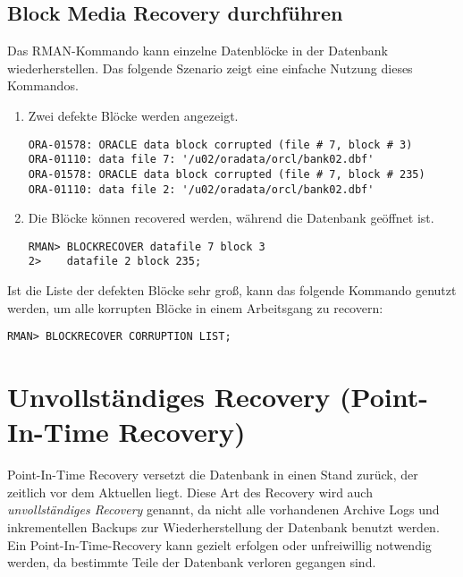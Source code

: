       \subsection{Block Media Recovery durchführen}
        Das RMAN-Kommando  kann einzelne Datenblöcke in der Datenbank wiederherstellen. Das folgende Szenario zeigt eine einfache Nutzung dieses Kommandos.
        \begin{enumerate}
          \item Zwei defekte Blöcke werden angezeigt.
          \begin{lstlisting}[caption={Der Fehler ORA-01578},label=admin1494,language=terminal]
ORA-01578: ORACLE data block corrupted (file # 7, block # 3)
ORA-01110: data file 7: '/u02/oradata/orcl/bank02.dbf'
ORA-01578: ORACLE data block corrupted (file # 7, block # 235)
ORA-01110: data file 2: '/u02/oradata/orcl/bank02.dbf'
          \end{lstlisting}
          \item Die Blöcke können recovered werden, während die Datenbank geöffnet ist.
          \begin{lstlisting}[caption={Das Kommando BLOCKRECOVER},label=admin1495,language=rman]
RMAN> BLOCKRECOVER datafile 7 block 3
2>    datafile 2 block 235;
          \end{lstlisting}
        \end{enumerate}
        Ist die Liste der defekten Blöcke sehr groß, kann das folgende Kommando genutzt werden, um alle korrupten Blöcke in einem Arbeitsgang zu recovern:
          \begin{lstlisting}[caption={Das Kommando BLOCKRECOVER},label=admin1496,language=rman]
RMAN> BLOCKRECOVER CORRUPTION LIST;
          \end{lstlisting}
        \begin{literaturinternet}
          \item \cite{i1016424}
        \end{literaturinternet}
    \section{Unvollständiges Recovery (Point-In-Time Recovery)}
      Point-In-Time Recovery versetzt die Datenbank in einen Stand zurück, der zeitlich vor dem Aktuellen liegt. Diese Art des Recovery wird auch \textit{unvollständiges Recovery} genannt, da nicht alle vorhandenen Archive Logs und inkrementellen Backups zur Wiederherstellung der Datenbank benutzt werden. Ein Point-In-Time-Recovery kann gezielt erfolgen oder unfreiwillig notwendig werden, da bestimmte Teile der Datenbank verloren gegangen sind.
